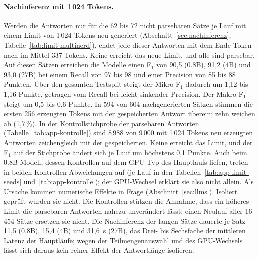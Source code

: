 \paragraph{Nachinferenz mit 1\,024 Tokens.}
Werden die Antworten nur für die 62 bis 72 nicht parsebaren Sätze je Lauf
mit einem Limit von 1\,024 Tokens neu generiert (Abschnitt~\ref{sec:nachinferenz},
Tabelle~\ref{tab:limit-multinerd}), endet
jede dieser Antworten mit dem Ende-Token nach im Mittel 337 Tokens.
Keine erreicht das neue Limit, und alle sind parsebar.
Auf diesen Sätzen erreichen die Modelle einen F$_1$ von 90,5
(0.8B), 91,2 (4B) und 93,0 (27B) bei einem Recall von 97 bis 98 und einer
Precision von 85 bis 88 Punkten.
Über den gesamten Testsplit steigt der Mikro-F$_1$ dadurch um 1,12 bis
1,16 Punkte, getragen vom Recall bei leicht sinkender Precision. Der
Makro-F$_1$ steigt um 0,5 bis 0,6 Punkte.
In 594 von 604 nachgenerierten Sätzen stimmen die ersten
256 erzeugten Tokens mit der gespeicherten Antwort überein; zehn
weichen ab (1,7\,\%).
In der Kontrollstichprobe der parsebaren Antworten
(Tabelle~\ref{tab:app-kontrolle}) sind 8\,988 von 9\,000 mit
1\,024 Tokens neu erzeugten Antworten zeichengleich mit der
gespeicherten. Keine erreicht das Limit, und der F$_1$ auf der
Stichprobe ändert sich je Lauf um höchstens 0,1 Punkte.
Auch beim 0.8B-Modell, dessen Kontrollen auf dem GPU-Typ des Hauptlaufs
liefen, treten in beiden Kontrollen Abweichungen auf (je Lauf in den
Tabellen~\ref{tab:app-limit-seeds} und~\ref{tab:app-kontrolle}); der
GPU-Wechsel
erklärt sie also nicht allein.
Als Ursache kommen numerische Effekte in Frage
(Abschnitt~\ref{sec:llms}). Isoliert geprüft wurden sie nicht.
Die Kontrollen stützen die Annahme, dass ein höheres Limit die parsebaren
Antworten nahezu unverändert lässt; einen Neulauf aller 16\,454 Sätze
ersetzen sie nicht.
Die Nachinferenz der langen Sätze dauerte je Satz 11,5 (0.8B), 15,4 (4B)
und 31,6~s (27B), das Drei- bis Sechsfache der mittleren Latenz der
Hauptläufe; wegen der Teilmengenauswahl und des GPU-Wechsels lässt sich
daraus kein reiner Effekt der Antwortlänge isolieren.

\begin{table}[htbp]
  \centering
  \footnotesize
  \caption[Nachinferenz der abgeschnittenen Antworten mit 1\,024 Tokens]{Nachinferenz
  der am Limit von 256 Tokens abgeschnittenen Antworten mit 1\,024 Tokens
  (Abschnitt~\ref{sec:nachinferenz}): strikte Werte über alle 16\,454
  Testsätze in Punkten, Mittel über drei Seeds (F$_1$ und $\Delta$F$_1$
  mit Standardabweichung).
  Neu erzeugt: je Lauf neu generierte Sätze (Mittel); weiterhin
  abgeschnitten: davon am Limit von 1\,024 Tokens; Auslassungen:
  übersehene Referenzentitäten in Prozent
  (Abschnitt~\ref{sec:erg-fehlertypen}).}
  \label{tab:limit-multinerd}
  \setlength{\tabcolsep}{3pt}
  
\end{table}

